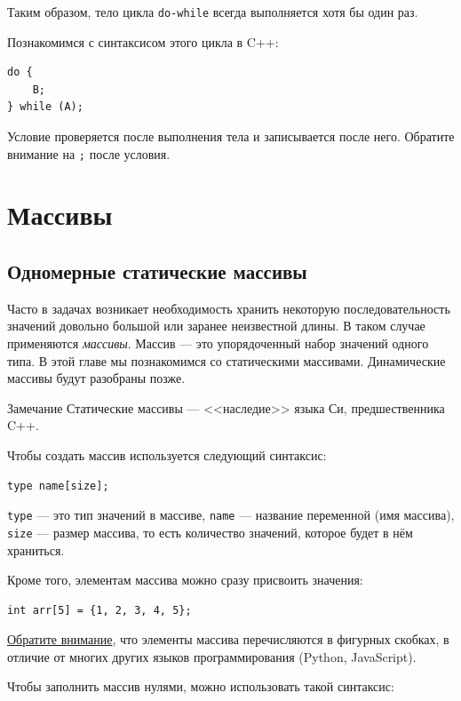 \documentclass{article}
\newcommand{\note}[1]{
	\begin{sectionenv}[yellow!30!white]{Замечание}
		#1
	\end{sectionenv}
}
\begin{document}
	Таким образом, тело цикла \texttt{do-while} всегда выполняется хотя бы один раз.
	
	Познакомимся с синтаксисом этого цикла в C++:
	
	\begin{lstlisting}
do {
	B;
} while (A);
	\end{lstlisting}
	
	Условие проверяется после выполнения тела и записывается после него. Обратите внимание на \texttt{;} после условия.
	
	\section{Массивы}
	
	\subsection{Одномерные статические массивы}
	
	Часто в задачах возникает необходимость хранить некоторую последовательность значений довольно большой или заранее неизвестной длины. В таком случае применяются \textit{массивы}. Массив --- это упорядоченный набор значений одного типа. В этой главе мы познакомимся со статическими массивами. Динамические массивы будут разобраны позже.
	
	\note{Статические массивы --- <<наследие>> языка Си, предшественника C++.}
	
	Чтобы создать массив используется следующий синтаксис:
	
	\begin{lstlisting}
type name[size];
	\end{lstlisting}
	
	\texttt{type} --- это тип значений в массиве, \texttt{name} --- название переменной (имя массива), \texttt{size} --- размер массива, то есть количество значений, которое будет в нём храниться.
	
	Кроме того, элементам массива можно сразу присвоить значения:
	
	\begin{lstlisting}
int arr[5] = {1, 2, 3, 4, 5};
	\end{lstlisting}
	
	\underline{Обратите внимание}, что элементы массива перечисляются в фигурных скобках, в отличие от многих других языков программирования (Python, JavaScript).

	Чтобы заполнить массив нулями, можно использовать такой синтаксис:
\end{document}
